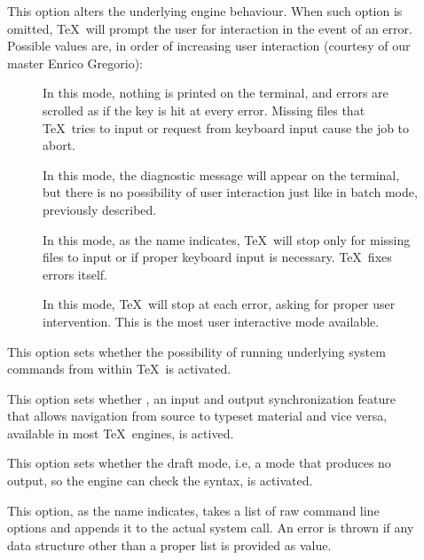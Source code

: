 \begin{description}
\begin{description}
\item[] This option alters the underlying engine behaviour. When such option is omitted, \TeX\ will prompt the user for interaction in the event of an error. Possible values are, in order of increasing user interaction (courtesy of our master Enrico Gregorio):

\begin{description}
\item[] In this mode, nothing is printed on the terminal, and errors are scrolled as if the  key is hit at every error. Missing files that \TeX\ tries to input or request from keyboard input cause the job to abort.

\item[] In this mode, the diagnostic message will appear on the terminal, but there is no possibility of user interaction just like in batch mode, previously described.

\item[] In this mode, as the name indicates, \TeX\ will stop only for missing files to input or if proper keyboard input is necessary. \TeX\ fixes errors itself.

\item[] In this mode, \TeX\ will stop at each error, asking for proper user intervention. This is the most user interactive mode available.
\end{description}

\item[] This option sets whether the possibility of running underlying system commands from within \TeX\ is activated.

\item[] This option sets whether , an input and output synchronization feature that allows navigation from source to typeset material and vice versa, available in most \TeX\ engines, is actived.

\item[] This option sets whether the draft mode, i.e, a mode that produces no output, so the engine can check the syntax, is activated.

\item[] This option, as the name indicates, takes a list of raw command line options and appends it to the actual system call. An error is thrown if any data structure other than a proper list is provided as value.
\end{description}


\end{description}
